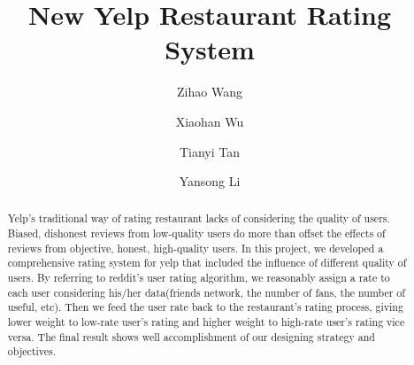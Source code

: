 \documentclass{stylefiles/capstone}
\begin{document}
\title{New Yelp Restaurant Rating System}


\author{Zihao Wang}

\author{Xiaohan Wu}

\author{Tianyi Tan}

\author{Yansong Li}


\renewcommand{\shortauthors}{Wang, Wu, Tan, Li}

\begin{abstract}
  Yelp’s traditional way of rating restaurant lacks of considering the quality of users. Biased, dishonest reviews from low-quality users do more than offset the effects of reviews from objective, honest, high-quality users. In this project, we developed a comprehensive rating system for yelp that included the influence of different quality of users. By referring to reddit’s user rating algorithm, we reasonably assign a rate to each user considering his/her data(friends network, the number of fans, the number of useful, etc). Then we feed the user rate back to the restaurant’s rating process, giving lower weight to low-rate user’s rating and higher weight to high-rate user’s rating vice versa. The final result shows well accomplishment of our designing strategy and objectives. 
\end{abstract}





\maketitle
\end{document}
